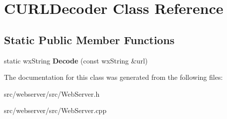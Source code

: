 \section{CURLDecoder Class Reference}
\label{classCURLDecoder}
\subsection*{Static Public Member Functions}
\begin{DoxyCompactItemize}
\item 
static wxString {\bfseries Decode} (const wxString \&url)\label{classCURLDecoder_a1ca27fd079cec421ea549a328a080ca0}

\end{DoxyCompactItemize}


The documentation for this class was generated from the following files:\begin{DoxyCompactItemize}
\item 
src/webserver/src/WebServer.h\item 
src/webserver/src/WebServer.cpp\end{DoxyCompactItemize}
